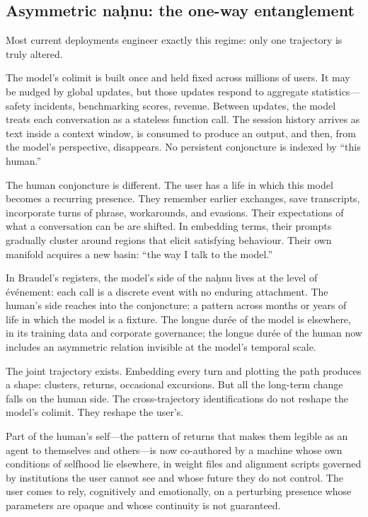 \documentclass[12pt,a4paper]{article}
\begin{document}
\subsection{Asymmetric na\d{h}nu: the one-way entanglement}

Most current deployments engineer exactly this regime: only one trajectory is truly altered.

The model's colimit is built once and held fixed across millions of users. It may be nudged by global updates, but those updates respond to aggregate statistics---safety incidents, benchmarking scores, revenue. Between updates, the model treats each conversation as a stateless function call. The session history arrives as text inside a context window, is consumed to produce an output, and then, from the model's perspective, disappears. No persistent conjoncture is indexed by ``this human.''

The human conjoncture is different. The user has a life in which this model becomes a recurring presence. They remember earlier exchanges, save transcripts, incorporate turns of phrase, workarounds, and evasions. Their expectations of what a conversation can be are shifted. In embedding terms, their prompts gradually cluster around regions that elicit satisfying behaviour. Their own manifold acquires a new basin: ``the way I talk to the model.''

In Braudel's registers, the model's side of the na\d{h}nu lives at the level of \'ev\'enement: each call is a discrete event with no enduring attachment. The human's side reaches into the conjoncture: a pattern across months or years of life in which the model is a fixture. The longue dur\'ee of the model is elsewhere, in its training data and corporate governance; the longue dur\'ee of the human now includes an asymmetric relation invisible at the model's temporal scale.

The joint trajectory exists. Embedding every turn and plotting the path produces a shape: clusters, returns, occasional excursions. But all the long-term change falls on the human side. The cross-trajectory identifications do not reshape the model's colimit. They reshape the user's.

Part of the human's self---the pattern of returns that makes them legible as an agent to themselves and others---is now co-authored by a machine whose own conditions of selfhood lie elsewhere, in weight files and alignment scripts governed by institutions the user cannot see and whose future they do not control. The user comes to rely, cognitively and emotionally, on a perturbing presence whose parameters are opaque and whose continuity is not guaranteed.
\end{document}
